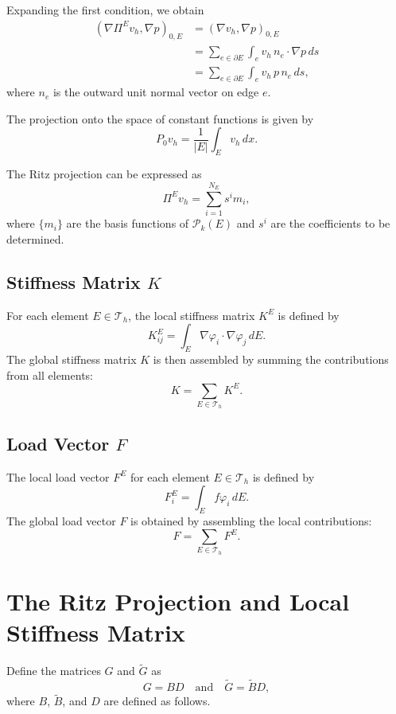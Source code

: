 \documentclass[class=article, crop=false]{standalone}
\begin{document}
Expanding the first condition, we obtain
\begin{align*}
(\nabla \Pi^E v_h, \nabla p)_{0,E} &= (\nabla v_h, \nabla p)_{0,E} \\
&= \sum_{e \in \partial E} \int_e v_h \, n_e \cdot \nabla p \, ds \\
&= \sum_{e \in \partial E} \int_e v_h \, p \, n_e \, ds,
\end{align*}
where $n_e$ is the outward unit normal vector on edge $e$.

The projection onto the space of constant functions is given by
\[
P_0 v_h = \frac{1}{|E|} \int_E v_h \, dx.
\]

The Ritz projection can be expressed as
\[
\Pi^E v_h = \sum_{i=1}^{N_E} s^i m_i,
\]
where $\{m_i\}$ are the basis functions of $\mathcal{P}_k(E)$ and $s^i$ are the coefficients to be determined.


\subsection{Stiffness Matrix $K$}
For each element $E \in \mathcal{T}_h$, the local stiffness matrix $K^E$ is defined by
\[
K^E_{ij} = \int_E \nabla \varphi_i \cdot \nabla \varphi_j \, dE.
\]
The global stiffness matrix $K$ is then assembled by summing the contributions from all elements:
\begin{equation}
    K = \sum_{E \in \mathcal{T}_h} K^E.
\end{equation}

\subsection{Load Vector $F$}
The local load vector $F^E$ for each element $E \in \mathcal{T}_h$ is defined by
\[
F^E_i = \int_E f \varphi_i \, dE.
\]
The global load vector $F$ is obtained by assembling the local contributions:
\begin{equation}
    F = \sum_{E \in \mathcal{T}_h} F^E.
\end{equation}

\section{The Ritz Projection and Local Stiffness Matrix}
Define the matrices $G$ and $\tilde{G}$ as
\[
G = BD \quad \text{and} \quad \tilde{G} = \tilde{B} D,
\]
where $B$, $\tilde{B}$, and $D$ are defined as follows.
\end{document}

